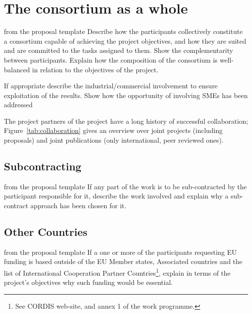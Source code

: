 \section{The {\protect\pn} consortium as a whole}
\begin{todo}{from the proposal template}
  Describe how the participants collectively constitute a consortium capable of achieving
  the project objectives, and how they are suited and are committed to the tasks assigned
  to them. Show the complementarity between participants. Explain how the composition of
  the consortium is well-balanced in relation to the objectives of the project.  

  If appropriate describe the industrial/commercial involvement to ensure exploitation of
  the results. Show how the opportunity of involving SMEs has been addressed
\end{todo}

The project partners of the \pn project have a long history of successful collaboration;
Figure~\ref{tab:collaboration} gives an overview over joint projects (including proposals) and
joint publications (only international, peer reviewed ones).

\coherencetable

\subsection{Subcontracting}\label{sec:subcontracting}
\begin{todo}{from the proposal template}
  If any part of the work is to be sub-contracted by the participant responsible for it,
  describe the work involved and explain why a sub-contract approach has been chosen for
  it.
\end{todo}
\subsection{Other Countries}\label{sec:other-countries}
\begin{todo}{from the proposal template}
  If a one or more of the participants requesting EU funding is based outside of the EU
  Member states, Associated countries and the list of International Cooperation Partner
  Countries\footnote{See CORDIS web-site, and annex 1 of the work programme.}, explain in
  terms of the project’s objectives why such funding would be essential.
\end{todo}

